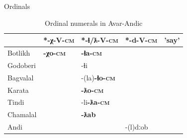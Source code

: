 \begin{frame}{Ordinals}


\begin{table}[h]
\caption{Ordinal numerals in Avar-Andic}
\label{tab:ord}
\begin{tabular}{l|llll}
                                                             & \multicolumn{1}{c}{*-χ-V-\textsc{cm}} & \multicolumn{1}{c}{*-ɬ/ƛ-V-\textsc{cm}} & \multicolumn{1}{c}{*-d-V-\textsc{cm}} & \multicolumn{1}{c}{'say'} \\ \hline
\rowcolor[HTML]{EFEFEF} 
Botlikh                                                      & \textbf{-χo-\textsc{cm}}                       & \textbf{-ɬa-\textsc{cm}}                &                              &                           \\
Godoberi                                                     &                              & {\color[HTML]{FE0000} -ɬi}     &                              &                           \\
\rowcolor[HTML]{EFEFEF} 
Bagvalal                                                     &                              & -(la)\textbf{-ɬo-\textsc{cm}}           &                              &                           \\
Karata                                                       &                              & \textbf{-ƛo-\textsc{cm}}                &                              &                           \\
\rowcolor[HTML]{EFEFEF} 
Tindi                                                        &                              & -li\textbf{-ƛa-\textsc{cm}}              &                              &                           \\
Chamalal                                                     &                              & \textbf{-ƛab}                  &                              &                           \\
\rowcolor[HTML]{EFEFEF} 
Andi                                                         &                              &                                & -(l)dːob                      &                           \\

\end{tabular}
\end{table}
\end{frame}

